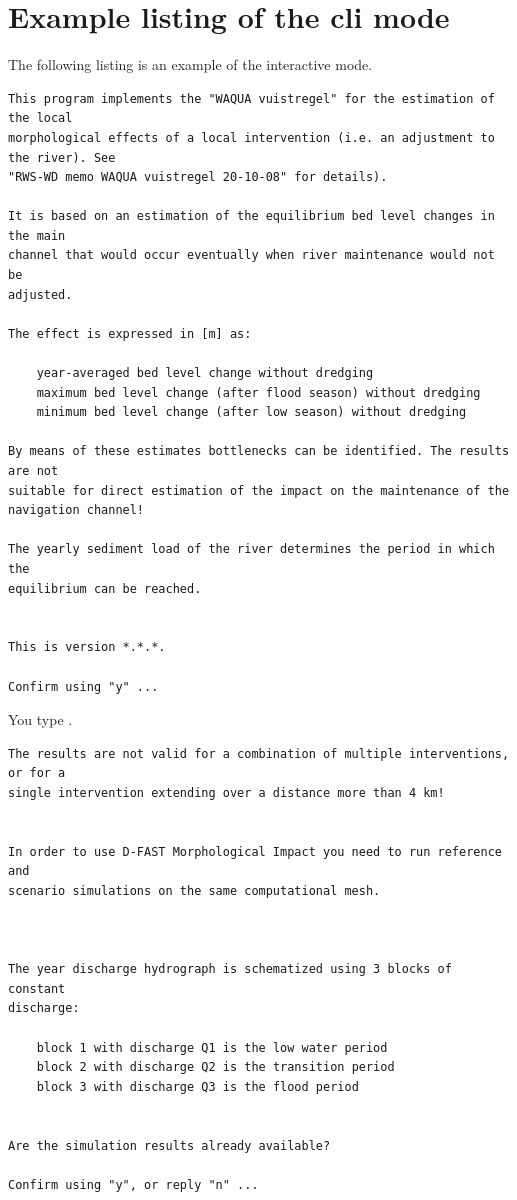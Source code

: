 \pagebreak[4]
\section{Example listing of the cli mode} \label{Sec:cli_dialog}

The following listing is an example of the interactive  mode.

\begin{Verbatim}
This program implements the "WAQUA vuistregel" for the estimation of the local
morphological effects of a local intervention (i.e. an adjustment to the river). See
"RWS-WD memo WAQUA vuistregel 20-10-08" for details).

It is based on an estimation of the equilibrium bed level changes in the main
channel that would occur eventually when river maintenance would not be
adjusted.

The effect is expressed in [m] as:

    year-averaged bed level change without dredging
    maximum bed level change (after flood season) without dredging
    minimum bed level change (after low season) without dredging

By means of these estimates bottlenecks can be identified. The results are not
suitable for direct estimation of the impact on the maintenance of the
navigation channel!

The yearly sediment load of the river determines the period in which the
equilibrium can be reached.


This is version *.*.*.

Confirm using "y" ...
\end{Verbatim}

You type .

\begin{Verbatim}
The results are not valid for a combination of multiple interventions, or for a
single intervention extending over a distance more than 4 km!


In order to use D-FAST Morphological Impact you need to run reference and
scenario simulations on the same computational mesh.



The year discharge hydrograph is schematized using 3 blocks of constant
discharge:

    block 1 with discharge Q1 is the low water period
    block 2 with discharge Q2 is the transition period
    block 3 with discharge Q3 is the flood period


Are the simulation results already available?

Confirm using "y", or reply "n" ...
\end{Verbatim}

